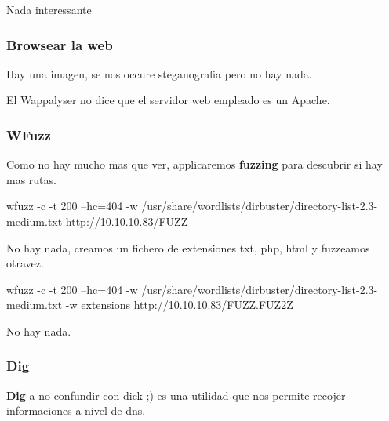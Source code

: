 \documentclass{assets/ipesethesis}
\newenvironment{Shaded}{\begin{snugshade}}{\end{snugshade}}
\newcommand{\ExtensionTok}[1]{#1}
\newcommand{\NormalTok}[1]{#1}
\begin{document}
Nada interessante

\hypertarget{browsear-la-web}{%
\subsubsection*{Browsear la web}\label{browsear-la-web}}

Hay una imagen, se nos occure steganografia pero no hay nada.

El Wappalyser no dice que el servidor web empleado es un Apache.

\hypertarget{wfuzz}{%
\subsubsection*{WFuzz}\label{wfuzz}}

Como no hay mucho mas que ver, applicaremos \textbf{fuzzing} para descubrir si hay mas rutas.

\begin{Shaded}
\begin{Highlighting}[]
\ExtensionTok{wfuzz}\NormalTok{ -c -t 200 --hc=404 -w /usr/share/wordlists/dirbuster/directory-list-2.3-medium.txt http://10.10.10.83/FUZZ}
\end{Highlighting}
\end{Shaded}

No hay nada, creamos un fichero de extensiones txt, php, html y fuzzeamos otravez.

\begin{Shaded}
\begin{Highlighting}[]
\ExtensionTok{wfuzz}\NormalTok{ -c -t 200 --hc=404 -w /usr/share/wordlists/dirbuster/directory-list-2.3-medium.txt -w extensions http://10.10.10.83/FUZZ.FUZ2Z}
\end{Highlighting}
\end{Shaded}

No hay nada.

\hypertarget{dig}{%
\subsubsection*{Dig}\label{dig}}

\textbf{Dig} a no confundir con dick ;) es una utilidad que nos permite recojer informaciones a nivel de dns.
\end{document}
